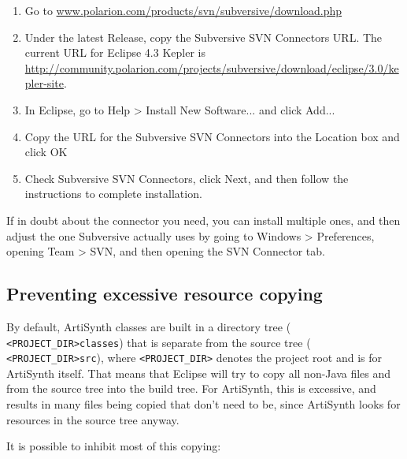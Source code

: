 \begin{enumerate}

\item  Go to 
\href{http://www.polarion.com/products/svn/subversive/download.php}%
{www.polarion.com/products/svn/subversive/download.php}

\item Under the latest {\sf Release}, copy the Subversive SVN
Connectors URL. The current URL for Eclipse 4.3 Kepler
is \href{http://community.polarion.com/projects/subversive/download/eclipse/3.0/kepler-site/}%
{http://community.polarion.com/projects/subversive/download/eclipse/3.0/kepler-site}.

\item In Eclipse, go to {\sf Help > Install New Software...} and 
click {\sf Add...}  

\item Copy the URL for the Subversive SVN Connectors into the {\sf
Location} box and click {\sf OK}

\item Check {\sf Subversive SVN Connectors}, click {\sf Next}, and
then follow the instructions to complete installation.

\end{enumerate}

If in doubt about the connector you need, you can install multiple
ones, and then adjust the one Subversive actually uses by going to
{\sf Windows > Preferences}, opening {\sf Team > SVN}, and then
opening the {\sf SVN Connector} tab.

\subsection{Preventing excessive resource copying}

By default, ArtiSynth classes are built in a directory tree ({\tt
<PROJECT\_DIR>\SEP classes}) that is separate from the source tree ({\tt
<PROJECT\_DIR>\SEP src}), where {\tt <PROJECT\_DIR>} denotes the project
root \directory{} and is \ArtHome[] for ArtiSynth itself.
That means that Eclipse will try to copy all non-Java files and
\directories{} from the source tree into the build tree. For ArtiSynth,
this is excessive, and results in many files being copied that don't
need to be, since ArtiSynth looks for resources in the source tree
anyway.

It is possible to inhibit most of this copying:

